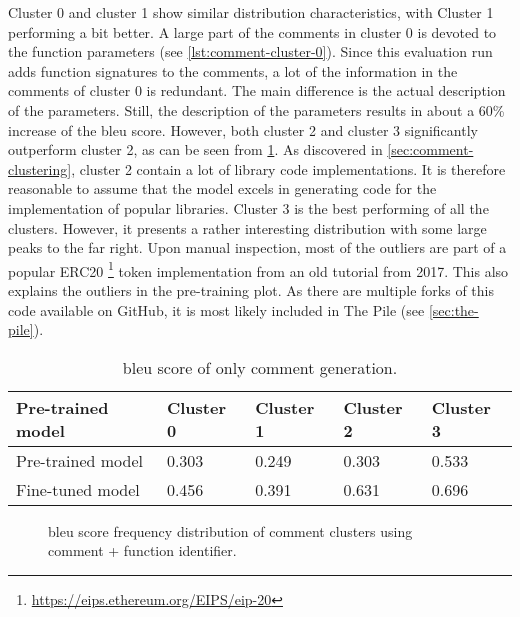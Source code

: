 Cluster 0 and cluster 1 show similar distribution characteristics, with Cluster 1 performing a bit better. A large part of the comments in cluster 0 is devoted to the function parameters (see \cref{lst:comment-cluster-0}). Since this evaluation run adds function signatures to the comments, a lot of the information in the comments of cluster 0 is redundant. The main difference is the actual description of the parameters. Still, the description of the parameters results in about a 60\% increase of the \acrshort{bleu} score. However, both cluster 2 and cluster 3 significantly outperform cluster 2, as can be seen from \cref{tab:comments-bleu-score}. As discovered in \cref{sec:comment-clustering}, cluster 2 contain a lot of library code implementations. It is therefore reasonable to assume that the model excels in generating code for the implementation of popular libraries. Cluster 3 is the best performing of all the clusters. However, it presents a rather interesting distribution with some large peaks to the far right. Upon manual inspection, most of the outliers are part of a popular ERC20 \footnote{\url{https://eips.ethereum.org/EIPS/eip-20}} token implementation from an old tutorial \cite{moritz2017how} from 2017. This also explains the outliers in the pre-training plot. As there are multiple forks of this code available on GitHub, it is most likely included in The Pile (see \cref{sec:the-pile}).

\begin{table}
    \def\arraystretch{1.5}
    \small
    \centering
    \caption{\acrshort{bleu} score of only comment generation.}
    \label{tab:comments-bleu-score}
    \begin{tabularx}{\textwidth}{XXXXX}
        \toprule
        \textbf{Pre-trained model} & Cluster 0 & Cluster 1 & Cluster 2 & Cluster 3\\
        \midrule
        Pre-trained model & 0.303 & 0.249 & 0.303 & 0.533\\
        Fine-tuned model & 0.456 & 0.391 & 0.631 & 0.696\\
        \bottomrule
    \end{tabularx}
\end{table}


\begin{figure}[htp]
    \centering
    
    \caption{\acrshort{bleu} score frequency distribution of comment clusters using comment + function identifier.}
    \label{fig:performance-comments-identidier}
\end{figure}


